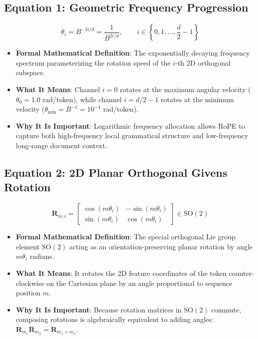 \documentclass[11pt,a4paper]{article}
\theoremstyle{definition}
\begin{document}
\subsection{\textbf{Equation 1: Geometric Frequency Progression}}
{\boldmath
\begin{equation}
\theta_i = B^{-2i/d} = \frac{1}{B^{2i/d}}, \qquad i \in \left\{0, 1, \dots, \frac{d}{2} - 1\right\}
\end{equation}
}
\begin{itemize}
    \item \textbf{Formal Mathematical Definition}:
    The exponentially decaying frequency spectrum parameterizing the rotation speed of the $i$-th 2D orthogonal subspace.
    \item \textbf{What It Means}:
    Channel $i=0$ rotates at the maximum angular velocity ($\theta_0 = 1.0$ rad/token), while channel $i = d/2 - 1$ rotates at the minimum velocity ($\theta_{\text{min}} = B^{-1} = 10^{-4}$ rad/token).
    \item \textbf{Why It Is Important}:
    Logarithmic frequency allocation allows RoPE to capture both high-frequency local grammatical structure and low-frequency long-range document context.
\end{itemize}

\subsection{\textbf{Equation 2: 2D Planar Orthogonal Givens Rotation}}
{\boldmath
\begin{equation}
\mathbf{R}_{m, i} = \begin{bmatrix} \cos(m \theta_i) & -\sin(m \theta_i) \\ \sin(m \theta_i) & \cos(m \theta_i) \end{bmatrix} \in \mathrm{SO}(2)
\end{equation}
}
\begin{itemize}
    \item \textbf{Formal Mathematical Definition}:
    The special orthogonal Lie group element $\mathrm{SO}(2)$ acting as an orientation-preserving planar rotation by angle $m \theta_i$ radians.
    \item \textbf{What It Means}:
    It rotates the 2D feature coordinates of the token counter-clockwise on the Cartesian plane by an angle proportional to sequence position $m$.
    \item \textbf{Why It Is Important}:
    Because rotation matrices in $\mathrm{SO}(2)$ commute, composing rotations is algebraically equivalent to adding angles: $\mathbf{R}_{m_1} \mathbf{R}_{m_2} = \mathbf{R}_{m_1 + m_2}$.
\end{itemize}
\end{document}
